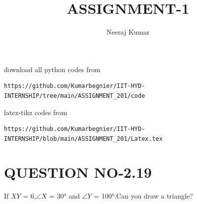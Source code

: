 \documentclass[journal,12pt,twocolumn]{IEEEtran}
\begin{document}
     \def\rightbox#1{\makebox[0in][r]{#1}}
     \def\centbox#1{\makebox[0in]{#1}}
     \def\topbox#1{\raisebox{-\baselineskip}[0in][0in]{#1}}
     \def\midbox#1{\raisebox{-0.5\baselineskip}[0in][0in]{#1}}
\vspace{3cm}
\title{ASSIGNMENT-1}
\author{Neeraj Kumar}
\maketitle
\newpage
\bigskip
\renewcommand{\thefigure}{\theenumi}
\renewcommand{\thetable}{\theenumi}
%
download all python codes from 
%
\begin{lstlisting}
https://github.com/Kumarbegnier/IIT-HYD-INTERNSHIP/tree/main/ASSIGNMENT_201/code
\end{lstlisting}
%
latex-tikz codes from
%
\begin{lstlisting}
https://github.com/Kumarbegnier/IIT-HYD-INTERNSHIP/blob/main/ASSIGNMENT_201/Latex.tex
\end{lstlisting}
%
\section{QUESTION NO-2.19}
 \noindent If  $XY$ = 6,$\angle{X}$ = \ang{30} and $\angle{Y}$ = \ang{100}.Can you draw a triangle?
%
\end{document}

